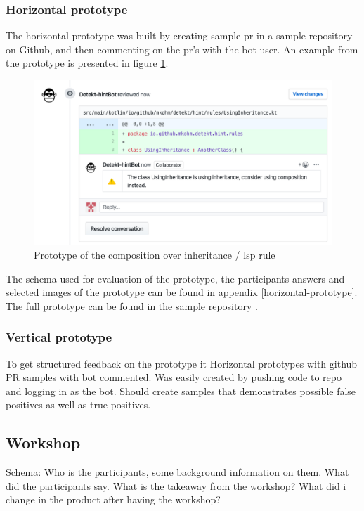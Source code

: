 \documentclass{article}
\begin{document}
\subsubsection{Horizontal prototype}
The horizontal prototype was built by creating sample \gls{pr} in a sample repository on Github\cite{sample-repository}, and then commenting on the \gls{pr}'s with the bot user. An example from the prototype is presented in figure \ref{fig:liskov}. 

\begin{figure}[h!]
    \centering
    \includegraphics[width=\textwidth]{../demo.png}
    \caption{Prototype of the composition over inheritance / \gls{lsp} rule}
    \label{fig:liskov}
\end{figure}


The schema used for evaluation of the prototype, the participants answers and selected images of the prototype can be found in appendix \ref{horizontal-prototype}. The full prototype can be found in the sample repository \cite{sample-repository}. 

\subsubsection{Vertical prototype}
To get structured feedback on the prototype it 
Horizontal prototypes with github PR samples with bot commented. Was easily created by pushing code to repo and logging in as the bot. Should create samples that demonstrates possible false positives as well as true positives. 

\subsection{Workshop}
Schema:
Who is the participants, some background information on them. What did the participants say. What is the takeaway from the workshop? What did i change in the product after having the workshop?
\end{document}

